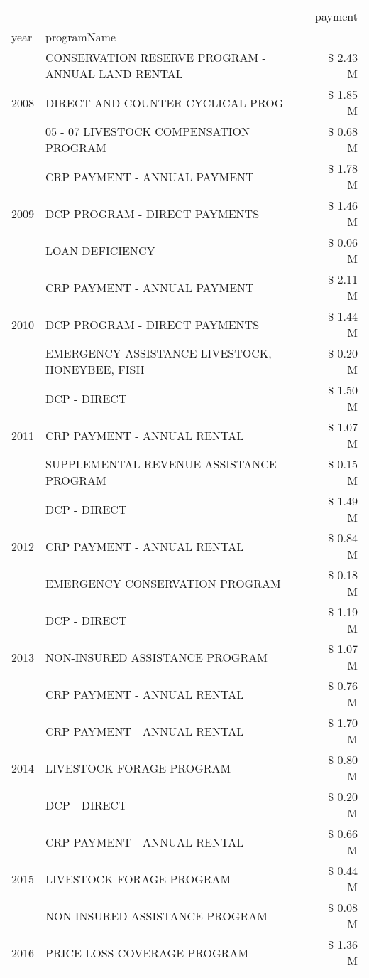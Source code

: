 \begin{tabular}{llr}
\toprule
 &  & payment \\
year & programName &  \\
\midrule
\multirow[t]{3}{*}{2008} & CONSERVATION RESERVE PROGRAM - ANNUAL LAND RENTAL & \$ 2.43 M \\
 & DIRECT AND COUNTER CYCLICAL PROG & \$ 1.85 M \\
 & 05 - 07 LIVESTOCK COMPENSATION PROGRAM & \$ 0.68 M \\
\cline{1-3}
\multirow[t]{3}{*}{2009} & CRP PAYMENT - ANNUAL PAYMENT & \$ 1.78 M \\
 & DCP PROGRAM - DIRECT PAYMENTS & \$ 1.46 M \\
 & LOAN DEFICIENCY & \$ 0.06 M \\
\cline{1-3}
\multirow[t]{3}{*}{2010} & CRP PAYMENT - ANNUAL PAYMENT & \$ 2.11 M \\
 & DCP PROGRAM - DIRECT PAYMENTS & \$ 1.44 M \\
 & EMERGENCY ASSISTANCE LIVESTOCK, HONEYBEE, FISH & \$ 0.20 M \\
\cline{1-3}
\multirow[t]{3}{*}{2011} & DCP - DIRECT & \$ 1.50 M \\
 & CRP PAYMENT - ANNUAL RENTAL & \$ 1.07 M \\
 & SUPPLEMENTAL REVENUE ASSISTANCE PROGRAM & \$ 0.15 M \\
\cline{1-3}
\multirow[t]{3}{*}{2012} & DCP - DIRECT & \$ 1.49 M \\
 & CRP PAYMENT - ANNUAL RENTAL & \$ 0.84 M \\
 & EMERGENCY CONSERVATION PROGRAM & \$ 0.18 M \\
\cline{1-3}
\multirow[t]{3}{*}{2013} & DCP - DIRECT & \$ 1.19 M \\
 & NON-INSURED ASSISTANCE PROGRAM & \$ 1.07 M \\
 & CRP PAYMENT - ANNUAL RENTAL & \$ 0.76 M \\
\cline{1-3}
\multirow[t]{3}{*}{2014} & CRP PAYMENT - ANNUAL RENTAL & \$ 1.70 M \\
 & LIVESTOCK FORAGE PROGRAM & \$ 0.80 M \\
 & DCP - DIRECT & \$ 0.20 M \\
\cline{1-3}
\multirow[t]{3}{*}{2015} & CRP PAYMENT - ANNUAL RENTAL & \$ 0.66 M \\
 & LIVESTOCK FORAGE PROGRAM & \$ 0.44 M \\
 & NON-INSURED ASSISTANCE PROGRAM & \$ 0.08 M \\
\cline{1-3}
\multirow[t]{3}{*}{2016} & PRICE LOSS COVERAGE PROGRAM & \$ 1.36 M \\

\end{tabular}
